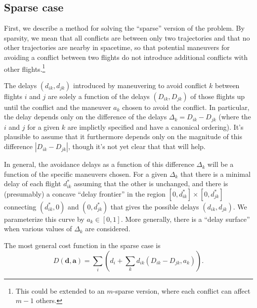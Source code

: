 \documentclass{article}
\begin{document}
\subsection{Sparse case}

First, we describe a method for solving the ``sparse'' version of the problem. 
By sparsity, we mean that all conflicts are between only two trajectories and that no other trajectories are nearby in spacetime, so that potential maneuvers for avoiding a conflict between two flights do not introduce additional conflicts with other flights.\footnote{This could be extended to an $m$-sparse version, where each conflict can affect $m-1$ others.}

The delays $(d_{ik}, d_{jk})$ introduced by maneuvering to avoid conflict $k$ between flights $i$ and $j$ are solely a function of the delays $(D_{ik}, D_{jk})$ of those flights up until the conflict and the maneuver $a_{k}$ chosen to avoid the conflict.
In particular, the delay depends only on the difference of the delays $\Delta_{k} = D_{ik} - D_{jk}$ (where the $i$ and $j$ for a given $k$ are implictly specified and have a canonical ordering).
It's plausible to assume that it furthermore depends only on the magnitude of this difference $|D_{ik} - D_{jk}|$, though it's not yet clear that that will help.

In general, the avoidance delays as a function of this difference $\Delta_{k}$ will be a function of the specific maneuvers chosen. 
For a given $\Delta_{k}$ that there is a minimal delay of each flight $d_{ik}^*$ assuming that the other is unchanged, and there is (presumably) a concave ``delay frontier'' in the region $[0, d_{ik}^*] \times [0, d_{jk}^*]$ connecting $(d_{ik}^*, 0)$ and $(0, d_{jk}^*)$ that gives the possible delays $(d_{ik}, d_{jk})$. 
We parameterize this curve by $a_{k} \in [0, 1]$.
More generally, there is a ``delay surface'' when various values of $\Delta_{k}$ are considered.

The most general cost function in the sparse case is 
\begin{equation*}
D(\mathbf d, \mathbf a) 
=
\sum_i \left(d_i + \sum_k d_{ik} (D_{ik} - D_{jk}, a_k)\right).
\end{equation*}
\end{document}

